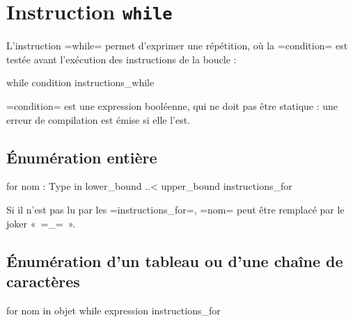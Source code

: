 \section{Instruction \texttt{while}}

L'instruction \omnibus=while= permet d'exprimer une répétition, où la \omnibus=condition= est testée avant l'exécution des instructions de la boucle :
\begin{OMNIBUS}
while condition {
  instructions_while
}
\end{OMNIBUS}

\omnibus=condition= est une expression booléenne, qui ne doit pas être statique : une erreur de compilation est émise si elle l'est.














\subsection{Énumération entière}
\begin{OMNIBUS}
for nom : Type in lower_bound ..< upper_bound {
  instructions_for
}
\end{OMNIBUS}

Si il n'est pas lu par les \omnibus=instructions_for=, \omnibus=nom= peut être remplacé par le joker « \omnibus=_= ».




\subsection{Énumération d'un tableau ou d'une chaîne de caractères}

\begin{OMNIBUS}
for nom in objet while expression {
  instructions_for
}
\end{OMNIBUS}


























